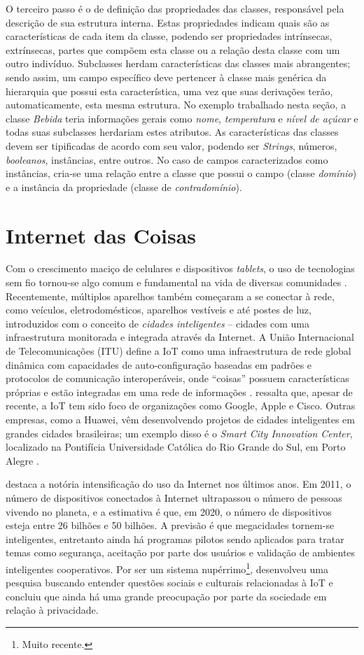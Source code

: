 O terceiro passo é o de definição das propriedades das classes, responsável pela descrição de sua estrutura interna. Estas propriedades indicam quais são as características de cada item da classe, podendo ser propriedades intrínsecas, extrínsecas, partes que compõem esta classe ou a relação desta classe com um outro indivíduo. Subclasses herdam características das classes mais abrangentes; sendo assim, um campo específico deve pertencer à classe mais genérica da hierarquia que possui esta característica, uma vez que suas derivações terão, automaticamente, esta mesma estrutura. No exemplo trabalhado nesta seção, a classe \emph{Bebida} teria informações gerais como \emph{nome}, \emph{temperatura} e \emph{nível de açúcar} e todas suas subclasses herdariam estes atributos. As características das classes devem ser tipificadas de acordo com seu valor, podendo ser \emph{Strings}, números, \emph{booleanos}, instâncias, entre outros. No caso de campos caracterizados como instâncias, cria-se uma relação entre a classe que possui o campo (classe \emph{domínio}) e a instância da propriedade (classe de \emph{contradomínio}).

\section{Internet das Coisas}
Com o crescimento maciço de celulares e dispositivos \emph{tablets}, o uso de tecnologias sem fio tornou-se algo comum e fundamental na vida de diversas comunidades \cite{SHIN2014}. Recentemente, múltiplos aparelhos também começaram a se conectar à rede, como veículos, eletrodomésticos, aparelhos vestíveis e até postes de luz, introduzidos com o conceito de \emph{cidades inteligentes} -- cidades com uma infraestrutura monitorada e integrada através da Internet. A União Internacional de Telecomunicações (ITU) define a IoT como uma infraestrutura de rede global dinâmica com capacidades de auto-configuração baseadas em padrões e protocolos de comunicação interoperáveis, onde “coisas” possuem características próprias e estão integradas em uma rede de informações \cite{FRIESS2013}. \cite{FRIESS2013} ressalta que, apesar de recente, a IoT tem sido foco de organizações como Google, Apple e Cisco. Outras empresas, como a Huawei, vêm desenvolvendo projetos de cidades inteligentes em grandes cidades brasileiras; um exemplo disso é o \emph{Smart City Innovation Center}, localizado na Pontifícia Universidade Católica do Rio Grande do Sul, em Porto Alegre \cite{RIGON2016}.

\cite{FRIESS2013} destaca a notória intensificação do uso da Internet nos últimos anos. Em 2011, o número de dispositivos conectados à Internet ultrapassou o número de pessoas vivendo no planeta, e a estimativa é que, em 2020, o número de dispositivos esteja entre 26 bilhões e 50 bilhões. A previsão é que megacidades tornem-se inteligentes, entretanto ainda há programas pilotos sendo aplicados para tratar temas como segurança, aceitação por parte dos usuários e validação de ambientes inteligentes cooperativos. Por ser um sistema nupérrimo\footnote{Muito recente.}, \cite{SHIN2014} desenvolveu uma pesquisa buscando entender questões sociais e culturais relacionadas à IoT e concluiu que ainda há uma grande preocupação por parte da sociedade em relação à privacidade.

